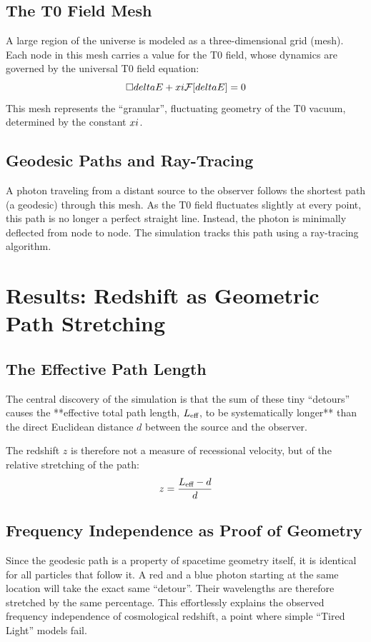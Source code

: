 \documentclass[12pt,a4paper]{report}
\begin{document}
	\subsection{The T0 Field Mesh}
	A large region of the universe is modeled as a three-dimensional grid (mesh). Each node in this mesh carries a value for the T0 field, whose dynamics are governed by the universal T0 field equation:
	\begin{equation}
		\square delta E + xi \mathcal{F}[delta E] = 0
	\end{equation}
	This mesh represents the ``granular'', fluctuating geometry of the T0 vacuum, determined by the constant $xi$.
	
	\subsection{Geodesic Paths and Ray-Tracing}
	A photon traveling from a distant source to the observer follows the shortest path (a geodesic) through this mesh. As the T0 field fluctuates slightly at every point, this path is no longer a perfect straight line. Instead, the photon is minimally deflected from node to node. The simulation tracks this path using a ray-tracing algorithm.
	
	\section{Results: Redshift as Geometric Path Stretching}
	
	\subsection{The Effective Path Length}
	The central discovery of the simulation is that the sum of these tiny ``detours'' causes the **effective total path length, $L_{\text{eff}}$, to be systematically longer** than the direct Euclidean distance $d$ between the source and the observer.
	
	The redshift $z$ is therefore not a measure of recessional velocity, but of the relative stretching of the path:
	\begin{equation}
		z = \frac{L_{\text{eff}} - d}{d}
	\end{equation}
	
	\subsection{Frequency Independence as Proof of Geometry}
	Since the geodesic path is a property of spacetime geometry itself, it is identical for all particles that follow it. A red and a blue photon starting at the same location will take the exact same ``detour''. Their wavelengths are therefore stretched by the same percentage. This effortlessly explains the observed frequency independence of cosmological redshift, a point where simple ``Tired Light'' models fail.
	
\end{document}
